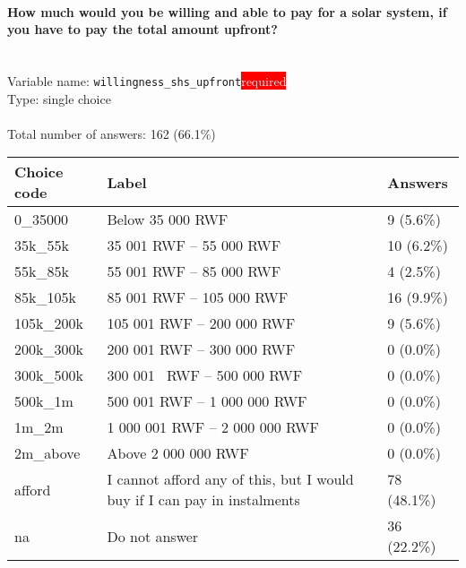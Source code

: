 \documentclass[11.5pt, a4paper]{scrartcl}
\begin{document}
\paragraph{How much would you be willing and able to pay for a solar system, if you have to pay the total amount upfront?}
\  \\Variable name: \texttt{willingness\_shs\_upfront}\hfill\colorbox{red}{\small{\textcolor{white}{required}}}\\
 Type: single choice\\
\\Total number of answers: 162 (66.1\%)
\\[0.2em] \begin{tabular}{p{4cm}|p{8cm}|p{3cm}}
Choice code & Label & Answers \\
\hline
0\_35000 & Below 35 000 RWF& \cellcolor{color0}9 (5.6\%)\\
\cellcolor{mygray} 35k\_55k & \cellcolor{mygray}35 001 RWF – 55 000 RWF & \cellcolor{color0}10 (6.2\%)\\
55k\_85k & 55 001 RWF – 85 000 RWF& \cellcolor{color0}4 (2.5\%)\\
\cellcolor{mygray} 85k\_105k & \cellcolor{mygray}85 001 RWF – 105 000 RWF & \cellcolor{color0}16 (9.9\%)\\
105k\_200k & 105 001 RWF – 200 000 RWF& \cellcolor{color0}9 (5.6\%)\\
\cellcolor{mygray} 200k\_300k & \cellcolor{mygray}200 001 RWF – 300 000 RWF & \cellcolor{color0}0 (0.0\%)\\
300k\_500k & 300 001  RWF – 500 000 RWF& \cellcolor{color0}0 (0.0\%)\\
\cellcolor{mygray} 500k\_1m & \cellcolor{mygray}500 001 RWF – 1 000 000 RWF & \cellcolor{color0}0 (0.0\%)\\
1m\_2m & 1 000 001 RWF – 2 000 000 RWF& \cellcolor{color0}0 (0.0\%)\\
\cellcolor{mygray} 2m\_above & \cellcolor{mygray}Above 2 000 000 RWF & \cellcolor{color0}0 (0.0\%)\\
afford & I cannot afford any of this, but I would buy if I can pay in instalments& \cellcolor{color2}78 (48.1\%)\\
\cellcolor{mygray} na & \cellcolor{mygray}Do not answer & \cellcolor{color1}36 (22.2\%)\\
\end{tabular}
\end{document}
